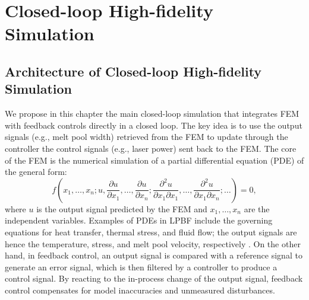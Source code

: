 \documentclass [11pt, proquest] {uwthesis}[2020/02/24]
\begin{document}

\part{Closed-loop High-fidelity Simulation} \label{part:Closed-loop-Simulation}


\chapter{Architecture of Closed-loop High-fidelity Simulation} \label{chap:Closed-loop-Simulation}

We propose in this chapter the main closed-loop simulation that integrates
FEM with feedback controls directly in a closed loop. The key idea
is to use the output signals (e.g., melt pool width) retrieved from
the FEM to update through the controller the control signals (e.g.,
laser power) sent back to the FEM. The core of the FEM is the numerical
simulation of a partial differential equation (PDE) of the general
form:
\[
f(x_{1},\ldots,x_{n};u,\frac{\partial u}{\partial x_{1}},\ldots,\frac{\partial u}{\partial x_{n}};\frac{\partial^{2}u}{\partial x_{1}\partial x_{1}},\ldots,\frac{\partial^{2}u}{\partial x_{1}\partial x_{n}};\ldots)=0,
\]
where $u$ is the output signal predicted by the FEM and $x_{1},\ldots,x_{n}$
are the independent variables. Examples of PDEs in LPBF include the
governing equations for heat transfer, thermal stress, and fluid flow;
the output signals are hence the temperature, stress, and melt pool
velocity, respectively \cite{luo2018survey,mukherjee2018heat}. On
the other hand, in feedback control, an output signal is compared
with a reference signal to generate an error signal, which is then
filtered by a controller to produce a control signal. By reacting
to the in-process change of the output signal, feedback control compensates
for model inaccuracies and unmeasured disturbances.
\end{document}
